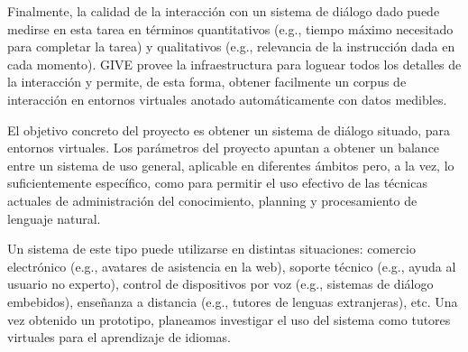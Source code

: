 Finalmente, la calidad de la interacci\'on con un
sistema de di\'alogo dado puede medirse en esta tarea en t\'erminos
quantitativos (e.g., tiempo m\'aximo necesitado para completar la tarea)
y qualitativos (e.g., relevancia de la instrucci\'on dada en cada momento).
GIVE provee la infraestructura para loguear todos los detalles de la
interacci\'on y permite, de esta forma, obtener facilmente un corpus
de interacci\'on en entornos virtuales anotado autom\'aticamente con
datos medibles.
\medskip

\noindent
El objetivo concreto del proyecto es obtener un sistema de di\'alogo
situado, para entornos virtuales.  Los par\'ametros del proyecto apuntan
a obtener un balance entre un sistema de uso general, aplicable en
diferentes \'ambitos pero, a la vez, lo suficientemente espec\'ifico,
como para permitir el uso efectivo de las t\'ecnicas actuales de
administraci\'on del conocimiento, planning y procesamiento de lenguaje
natural.

Un sistema de este tipo puede utilizarse en distintas situaciones:
comercio electr\'onico (e.g., avatares de asistencia en la web),
soporte t\'ecnico      (e.g., ayuda al usuario no experto),
control de dispositivos por voz (e.g., sistemas de di\'alogo embebidos),
ense\~nanza a distancia (e.g., tutores de lenguas extranjeras),
etc.  Una vez obtenido
un prototipo, planeamos investigar el uso del sistema como
tutores virtuales para el aprendizaje de idiomas.

